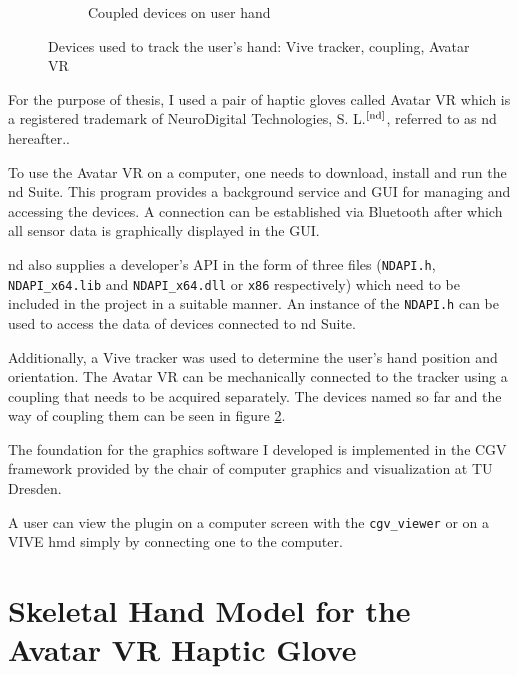 \documentclass[hyperref, bachelorofscience]{cgvpub}
\newcommand{\newcite}[1]{$ ^{\text{\cite{#1}}} $}
\begin{document}
\begin{figure}
\begin{subfigure}{.49\linewidth}
		\caption{Coupled devices on user hand}
		\label{fig:devices:cou}
	\end{subfigure}
	\caption[Devices used to track the user's hand]{Devices used to track the user's hand: Vive tracker, coupling, Avatar VR}
	\label{fig:devices}
\end{figure}

For the purpose of thesis, I used a pair of haptic gloves called Avatar VR which is a registered trademark of NeuroDigital Technologies, S. L.\newcite{nd}, referred to as \acrshort{nd} hereafter..

To use the Avatar VR on a computer, one needs to download, install and run the \acrshort{nd} Suite. This program provides a background service and GUI for managing and accessing the devices. A connection can be established via Bluetooth after which all sensor data is graphically displayed in the GUI.

\acrshort{nd} also supplies a developer's API in the form of three files (\lstinline|NDAPI.h|, \lstinline|NDAPI_x64.lib| and \lstinline|NDAPI_x64.dll| or \lstinline|x86| respectively) which need to be included in the project in a suitable manner. An instance of the \lstinline|NDAPI.h| can be used to access the data of devices connected to \acrshort{nd} Suite.

Additionally, a Vive tracker was used to determine the user's hand position and orientation. The Avatar VR can be mechanically connected to the tracker using a coupling that needs to be acquired separately. The devices named so far and the way of coupling them can be seen in figure \ref{fig:devices}.

The foundation for the graphics software I developed is implemented in the \gls{CGV} framework provided by the chair of computer graphics and visualization at TU Dresden.

A user can view the plugin on a computer screen with the \lstinline|cgv_viewer| or on a \Gls{VIVE} \acrfull{hmd} simply by connecting one to the computer.

\section{Skeletal Hand Model for the Avatar VR Haptic Glove} \label{sec:hand_model}
\end{document}

